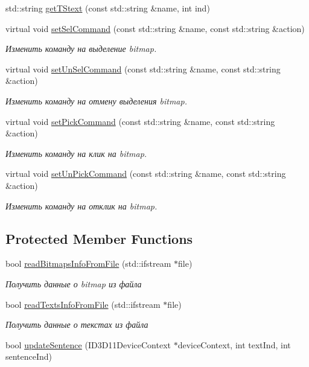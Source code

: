 \begin{DoxyCompactItemize}
std\+::string \hyperlink{class_interface_element_class_aef459140ce6fc4cfcf0b6fd017e73617}{get\+T\+Stext} (const std\+::string \&name, int ind)
\item 
virtual void \hyperlink{class_interface_element_class_a0e55bb0f0037715b19c29ce05a57abdc}{set\+Sel\+Command} (const std\+::string \&name, const std\+::string \&action)
\begin{DoxyCompactList}\small\item\em Изменить команду на выделение bitmap. \end{DoxyCompactList}\item 
virtual void \hyperlink{class_interface_element_class_ac327534caba198bf3347e1513cfe8491}{set\+Un\+Sel\+Command} (const std\+::string \&name, const std\+::string \&action)
\begin{DoxyCompactList}\small\item\em Изменить команду на отмену выделения bitmap. \end{DoxyCompactList}\item 
virtual void \hyperlink{class_interface_element_class_a866babb9cc309763567529771467fb76}{set\+Pick\+Command} (const std\+::string \&name, const std\+::string \&action)
\begin{DoxyCompactList}\small\item\em Изменить команду на клик на bitmap. \end{DoxyCompactList}\item 
virtual void \hyperlink{class_interface_element_class_a3823d61803f374b60458c9e8a7ff1505}{set\+Un\+Pick\+Command} (const std\+::string \&name, const std\+::string \&action)
\begin{DoxyCompactList}\small\item\em Изменить команду на отклик на bitmap. \end{DoxyCompactList}\end{DoxyCompactItemize}
\subsection*{Protected Member Functions}
\begin{DoxyCompactItemize}
\item 
bool \hyperlink{class_interface_element_class_a80958e5556a2970645b65a56431c88ca}{read\+Bitmaps\+Info\+From\+File} (std\+::ifstream $\ast$file)
\begin{DoxyCompactList}\small\item\em Получить данные о bitmap из файла \end{DoxyCompactList}\item 
bool \hyperlink{class_interface_element_class_afc8ee340b6aa0b99e3280b424aa5c519}{read\+Texts\+Info\+From\+File} (std\+::ifstream $\ast$file)
\begin{DoxyCompactList}\small\item\em Получить данные о текстах из файла \end{DoxyCompactList}\item 
bool \hyperlink{class_interface_element_class_aa1908c476bd6d840acd22dd137fcbd00}{update\+Sentence} (I\+D3\+D11\+Device\+Context $\ast$device\+Context, int text\+Ind, int sentence\+Ind)
\end{DoxyCompactItemize}
